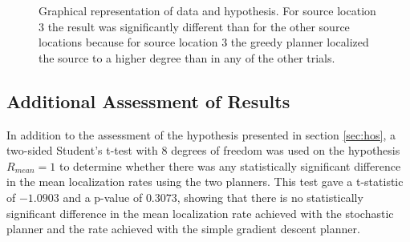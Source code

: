 \documentclass[submit, 12pt]{aiaa-pretty-modified}
\begin{document}
\begin{figure}
\begin{center}
\caption[Graphical representation of data and hypothesis.]{Graphical
  representation of data and hypothesis. For source location 3 the result was
  significantly different than for the other source locations because for source
  location 3 the greedy planner localized the source to a higher degree than in
  any of the other trials.}
\label{fig:killer}
\end{center}
\end{figure}


\subsection{Additional Assessment of Results}
\label{sec:additional}
In addition to the assessment of the hypothesis presented in section \ref{sec:hos}, a two-sided Student's
t-test with 8 degrees of freedom was used on the hypothesis $R_{mean}
= 1$ to determine whether there was any statistically significant
difference in the mean localization rates using the two planners.  This test gave
a t-statistic of $-1.0903$ and a p-value of $0.3073$, showing that
there is no statistically significant difference in the mean localization
rate achieved with the stochastic planner and the rate achieved with
the simple gradient descent planner.
\end{document}
